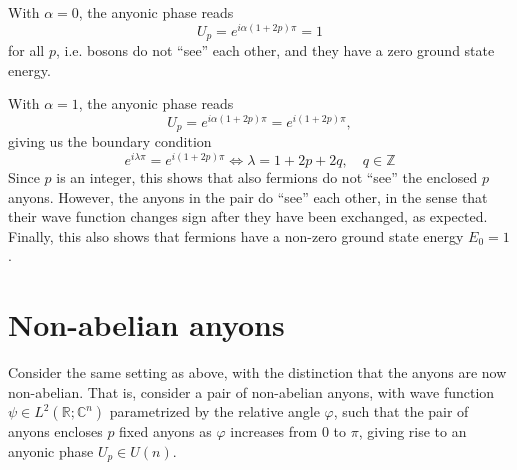 \begin{corollary}
  With $α = 0$, the anyonic phase reads
  \begin{equation}
    U_p = e^{iα(1+2p)π} = 1
  \end{equation}
  for all $p$, i.e. bosons do not ``see'' each other, and they have a zero ground state energy.

  With $α = 1$, the anyonic phase reads
  \begin{equation}
    U_p = e^{iα(1+2p)π} = e^{i(1+2p)π},
  \end{equation}
  giving us the boundary condition
  \begin{equation}
    e^{iλ π} = e^{i(1+2p)π} \iff λ = 1 + 2p + 2q, \quad q ∈ ℤ
  \end{equation}
  Since $p$ is an integer, this shows that also fermions do not ``see'' the enclosed $p$ anyons.
  However, the anyons in the pair do ``see'' each other, in the sense that their wave function changes sign after they have been exchanged, as expected. Finally, this also shows that fermions have a non-zero ground state energy $E_0 = 1$.
\end{corollary}












\section{Non-abelian anyons}

Consider the same setting as above, with the distinction that the anyons are now non-abelian. That is, consider a pair of non-abelian anyons, with wave function $ψ ∈ L^2(ℝ; \mathbb{C}^n)$ parametrized by the relative angle $\varphi$, such that the pair of anyons encloses $p$ fixed anyons as $\varphi$ increases from $0$ to $π$, giving rise to an anyonic phase $U_p ∈ U(n)$.





